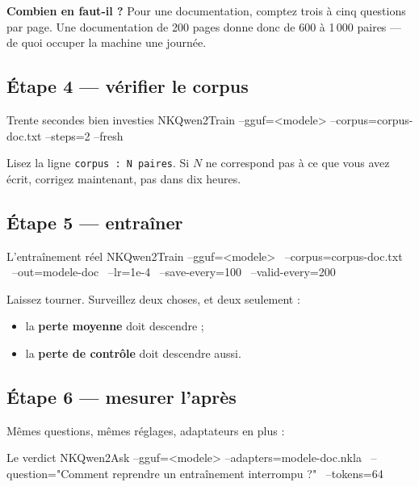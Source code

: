 \textbf{Combien en faut-il ?} Pour une documentation, comptez trois à cinq
questions par page. Une documentation de 200 pages donne donc de 600 à
1\,000 paires — de quoi occuper la machine une journée.

\subsection{Étape 4 — vérifier le corpus}

\begin{nkcode}[]{Trente secondes bien investies}
NKQwen2Train --gguf=<modele> --corpus=corpus-doc.txt --steps=2 --fresh
\end{nkcode}

Lisez la ligne \texttt{corpus : N paires}. Si $N$ ne correspond pas à ce que
vous avez écrit, corrigez maintenant, pas dans dix heures.

\subsection{Étape 5 — entraîner}

\begin{nkcode}[]{L'entraînement réel}
NKQwen2Train --gguf=<modele> \
             --corpus=corpus-doc.txt \
             --out=modele-doc \
             --lr=1e-4 \
             --save-every=100 \
             --valid-every=200
\end{nkcode}

Laissez tourner. Surveillez deux choses, et deux seulement :

\begin{itemize}
  \item la \textbf{perte moyenne} doit descendre ;
  \item la \textbf{perte de contrôle} doit descendre aussi.
\end{itemize}

\subsection{Étape 6 — mesurer l'après}

Mêmes questions, mêmes réglages, adaptateurs en plus :

\begin{nkcode}[]{Le verdict}
NKQwen2Ask --gguf=<modele> --adapters=modele-doc.nkla \
           --question="Comment reprendre un entraînement interrompu ?" \
           --tokens=64
\end{nkcode}


